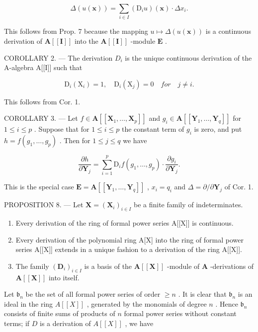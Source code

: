 \[
\Delta (u (\mathbf {x})) = \sum_ {i \in I} \left(\mathrm{D} _ {i} u\right) (\mathbf {x}) \cdot \Delta x _ {i}.\tag{17}
\]

This follows from Prop. 7 because the mapping \(u \mapsto \Delta(u(\mathbf{x}))\) is a continuous derivation of \(\mathbf{A}[[\mathbf{I}]]\) into the \(\mathbf{A}[[\mathbf{I}]]\) -module \(\mathbf{E}\) .

COROLLARY 2. --- The derivation \(D_{i}\) is the unique continuous derivation of the A-algebra A{[}{[}I{]}{]} such that

\[
\mathrm{D} _ {i} (\mathrm{X} _ {i}) = 1, \quad \mathrm{D} _ {i} (\mathrm{X} _ {j}) = 0 \quad f o r \quad j \neq i.\tag{18}
\]

This follows from Cor. 1.

COROLLARY 3. --- Let \(f \in \mathbf{A}[[\mathbf{X}_1, \ldots, \mathbf{X}_p]]\) and \(g_i \in \mathbf{A}[[\mathbf{Y}_1, \ldots, \mathbf{Y}_q]]\) for \(1 \leqslant i \leqslant p\) . Suppose that for \(1 \leqslant i \leqslant p\) the constant term of \(g_i\) is zero, and put \(h = f(g_1, \ldots, g_p)\) . Then for \(1 \leqslant j \leqslant q\) we have

\[
\frac {\partial h}{\partial \mathbf {Y} _ {j}} = \sum_ {i = 1} ^ {p} \mathrm{D} _ {i} f (g _ {1}, \dots , g _ {p}) \cdot \frac {\partial g _ {i}}{\partial \mathbf {Y} _ {j}}.\tag{19}
\]

This is the special case \(\mathbf{E} = \mathbf{A}[[\mathbf{Y}_1,\dots ,\mathbf{Y}_q]]\) , \(x_{i} = q_{i}\) and \(\Delta = \partial /\partial \mathbf{Y}_j\) of Cor. 1.

PROPOSITION 8. --- Let \(\mathbf{X} = (\mathbf{X}_i)_{i\in I}\) be a finite family of indeterminates.

\begin{enumerate}
\def\labelenumi{(\roman{enumi})}
\item
  Every derivation of the ring of formal power series A{[}{[}X{]}{]} is continuous.
\item
  Every derivation of the polynomial ring A{[}X{]} into the ring of formal power series A{[}{[}X{]}{]} extends in a unique fashion to a derivation of the ring A{[}{[}X{]}{]}.
\item
  The family \((\mathbf{D}_i)_{i\in I}\) is a basis of the \(\mathbf{A}[[\mathbf{X}]]\) -module of \(\mathbf{A}\) -derivations of \(\mathbf{A}[[\mathbf{X}]]\) into itself.
\end{enumerate}

Let \(\mathfrak{b}_n\) be the set of all formal power series of order \(\geqslant n\) . It is clear that \(\mathfrak{b}_n\) is an ideal in the ring \(A[[X]]\) , generated by the monomials of degree \(n\) . Hence \(\mathfrak{b}_n\) consists of finite sums of products of \(n\) formal power series without constant terms; if \(D\) is a derivation of \(A[[X]]\) , we have

